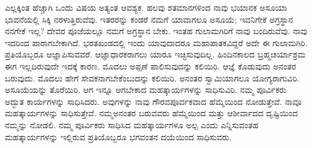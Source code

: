 ಎಲ್ಲಕ್ಕಿಂತ ಹೆಚ್ಚಾಗಿ ಒಂದು ವಿಷಯ ಅತ್ಯಂತ ಆವಶ್ಯಕ. ಹಲವು ಶತಮಾನ\-ಗಳಿಂದ ನಾವು ಭಯಾನಕ ಅಸೂಯಾ ಭಾವನೆಯಲ್ಲಿ ಸಿಕ್ಕಿ ನರಳುತ್ತಿರುವೆವು. ಇತರರನ್ನು ಕಂಡರೆ ನಮಗೆ ಯಾವಾಗಲೂ ಅಸೂಯೆ; ಇವನಿಗೇಕೆ ಅಗ್ರಸ್ಥಾನ ನನಗೇಕೆ ಇಲ್ಲ? ದೇವರ ಪೂಜೆಯಲ್ಲೂ ನಮಗೆ ಅಗ್ರಸ್ಥಾನ ಬೇಕು. ಇಂತಹ ಗುಲಾಮಗಿರಿಗೆ ನಾವು ಬಂದಿರುವೆವು. ನಾವು ಇದರಿಂದ ಪಾರಾಗಬೇಕಾಗಿದೆ. ಭರತಖಂಡದಲ್ಲಿ ಇಂದು ಯಾವುದಾದರೂ ಮಹಾಪಾತಕವಿದ್ದರೆ ಅದೇ ಈ ಗುಲಾಮಗಿರಿ. ಪ್ರತಿಯೊಬ್ಬರೂ ಆಜ್ಞಾಪಿಸುವವರೆ. ಆಜ್ಞಾಧಾರಕರಾಗಲು ಯಾರೂ ಇಚ್ಛಿಸುವುದಿಲ್ಲ. ಹಿಂದಿನಕಾಲದ ಬ್ರಹ್ಮಚರ್ಯಾಶ್ರಮ ಈಗ ಇಲ್ಲದಿರುವುದೇ ಇದಕ್ಕೆ ಕಾರಣ. ಮೊದಲು ಅಪ್ಪಣೆ ಪಾಲಿಸುವುದನ್ನು ಕಲಿಯಿರಿ. ಆಜ್ಞೆ ಕೊಡುವುದು ಅನಂತರ ಬರುವುದು. ಮೊದಲು ಹೇಗೆ ಸೇವಕನಾಗಬೇಕೆಂಬುದನ್ನು ಕಲಿಯಿರಿ. ಅನಂತರ ಸ್ವಾಮಿ\-ಯಾಗಲೂ ಯೋಗ್ಯರಾಗುವಿರಿ. ಅಸೂಯೆಯನ್ನು ತೊರೆಯಿರಿ. ಆಗ ಇನ್ನೂ ಆಗಬೇಕಾದ ಮಹತ್ಕಾರ್ಯಗಳನ್ನು ಸಾಧಿಸುವಿರಿ. ನಮ್ಮ ಪೂರ್ವಿಕರು ಅದ್ಭುತ ಕಾರ್ಯಗಳನ್ನು ಸಾಧಿಸಿದರು. ಅವುಗಳನ್ನು ನಾವು ಗೌರವಪೂರ್ವಕವಾದ ಹೆಮ್ಮೆಯಿಂದ ನೋಡುತ್ತೇವೆ. ನಾವೂ ಮಹತ್ಕಾರ್ಯಗಳನ್ನು ಸಾಧಿಸುತ್ತೇವೆ. ನಮ್ಮ\break ಅನಂತರ ಬರುವವರು ಹೆಮ್ಮೆಯಿಂದ ಮತ್ತು ಆಶೀರ್ವಾದದ ದೃಷ್ಟಿಯಿಂದ ನಮ್ಮನ್ನು ನೋಡಲಿ. ನಮ್ಮ ಪೂರ್ವಿಕರು ಸಾಧಿಸಿದ ಮಹತ್ಕಾರ್ಯಗಳೂ ಅಲ್ಪ ಎಂದು ಎನ್ನಿಸು\-ವಂತಹ ಮಹತ್ಕಾರ್ಯಗಳನ್ನು ಇಲ್ಲಿರುವ ಪ್ರತಿಯೊಬ್ಬರೂ ಭಗವಂತನ ದಯೆಯಿಂದ ಸಾಧಿಸುವರು. 

